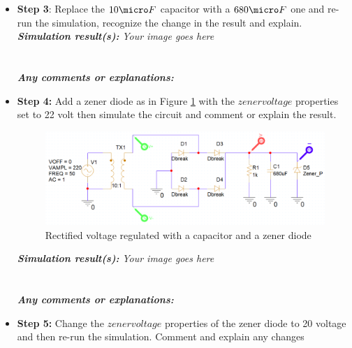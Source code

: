 \begin{itemize}
\dotfill\bigskip\par\mbox{}\dotfill \dotfill\bigskip\par\mbox{}\dotfill \dotfill\bigskip\par\mbox{}\dotfill \item \textbf{Step 3}: Replace the $10\micro F$ capacitor with a $680\micro F$ one and re-run the simulation, recognize the change in the result and explain.\\ \textit{\textbf{Simulation result(s):}} \textit{Your image goes here}\\ \\ \vspace{6cm} \\ \textbf{\textit{Any comments or explanations:}} \dotfill\bigskip\par\mbox{}\dotfill \dotfill\bigskip\par\mbox{}\dotfill \dotfill\bigskip\par\mbox{}\dotfill \dotfill\bigskip\par\mbox{}\dotfill \dotfill\bigskip\par\mbox{}\dotfill \dotfill\bigskip\par\mbox{}\dotfill \item \textbf{Step 4:} Add a zener diode as in Figure \ref{lab2_ex9_step3} with the $zener voltage$ properties set to 22 volt then simulate the circuit and comment or explain the result.  \begin{figure}[H] \centering \includegraphics[width=\linewidth]{source/content/lab2_ex9_step3.png} \caption{Rectified voltage regulated with a capacitor and a zener diode} \label{lab2_ex9_step3} \end{figure} \textit{\textbf{Simulation result(s):}} \textit{Your image goes here}\\ \\ \vspace{8cm} \\ \textbf{\textit{Any comments or explanations:}} \dotfill\bigskip\par\mbox{}\dotfill \dotfill\bigskip\par\mbox{}\dotfill \dotfill\bigskip\par\mbox{}\dotfill \dotfill\bigskip\par\mbox{}\dotfill \dotfill\bigskip\par\mbox{}\dotfill \dotfill\bigskip\par\mbox{}\dotfill \item \textbf{Step 5:} Change the $zener voltage$ properties of the zener diode to 20 voltage and then re-run the simulation. Comment and explain any changes 
\end{itemize}
